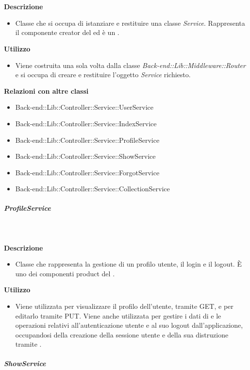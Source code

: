 				\textbf{\\ \\ Descrizione} 
					\begin{itemize}
						\item[] Classe che si occupa di istanziare e restituire una classe \textit{Service}. Rappresenta il componente creator del   ed è un  .
					\end{itemize}      
				\textbf{Utilizzo}  
					\begin{itemize}
						\item[] Viene costruita una sola volta dalla classe \textit{Back-end::Lib::Middleware::Router} e si occupa di creare e restituire l'oggetto \textit{Service} richiesto.
					\end{itemize}
					\textbf{Relazioni con altre classi}
					\begin{itemize}
							\item{Back-end::Lib::Controller::Service::UserService}
							\item{Back-end::Lib::Controller::Service::IndexService}
							\item{Back-end::Lib::Controller::Service::ProfileService}
							\item{Back-end::Lib::Controller::Service::ShowService}
							\item{Back-end::Lib::Controller::Service::ForgotService}
							\item{Back-end::Lib::Controller::Service::CollectionService}
					\end{itemize}
			\subparagraph{ProfileService}
				
				\textbf{\\ \\ Descrizione} 
					\begin{itemize}
						\item[] Classe che rappresenta la gestione di un profilo utente, il login e il logout. È uno dei componenti product del  .

					\end{itemize}      
				\textbf{Utilizzo}  
					\begin{itemize}
						\item[] Viene utilizzata per visualizzare il profilo dell'utente, tramite GET, e per editarlo tramite PUT. Viene anche utilizzata per gestire i dati di e le operazioni relativi all'autenticazione utente e al suo logout dall'applicazione, occupandosi della creazione della sessione utente e della sua distruzione tramite .
					\end{itemize}
			\subparagraph{ShowService}
				

